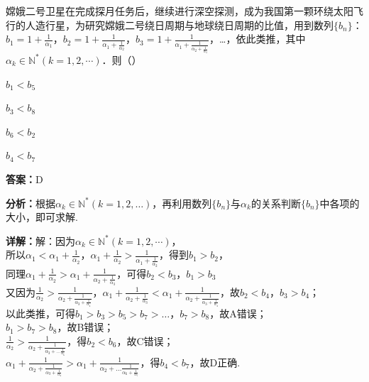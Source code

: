 \begin{question}[points=5]
嫦娥二号卫星在完成探月任务后，继续进行深空探测，成为我国第一颗环绕太阳飞行的人造行星，为研究嫦娥二号绕日周期与地球绕日周期的比值，用到数列$\{b_n\}$：$b_1 = 1 + \frac{1}{\alpha_1}$，$b_2 = 1 + \frac{1}{\alpha_1 + \frac{1}{\alpha_2}}$，$b_3 = 1 + \frac{1}{\alpha_1 + \frac{1}{\alpha_2 + \frac{1}{\alpha_3}}}$，…，依此类推，其中$\alpha_k \in \mathbb{N}^* (k = 1, 2, \cdots)$．则（\qquad）
\begin{choices}
  \item $b_1 < b_5$
  \item $b_3 < b_8$
  \item $b_6 < b_2$
  \item $b_4 < b_7$
\end{choices}
\begin{solution}
\textbf{答案：}D

\textbf{分析：}根据$\alpha_k \in \mathbb{N}^* (k = 1, 2, \dots)$，再利用数列$\{b_n\}$与$\alpha_k$的关系判断$\{b_n\}$中各项的大小，即可求解.

\textbf{详解：}解：因为$\alpha_k \in \mathbb{N}^* (k = 1, 2, \cdots)$，\\所以$\alpha_1 < \alpha_1 + \frac{1}{\alpha_2}$，$\alpha_1 + \frac{1}{\alpha_2} > \frac{1}{\alpha_1 + \frac{1}{\alpha_2}}$，得到$b_1 > b_2$，\\同理$\alpha_1 + \frac{1}{\alpha_2} > \alpha_1 + \frac{1}{\alpha_2 + \frac{1}{\alpha_3}}$，可得$b_2 < b_3$，$b_1 > b_3$\\又因为$\frac{1}{\alpha_2} > \frac{1}{\alpha_2 + \frac{1}{\alpha_3 + \frac{1}{\alpha_4}}}$，$\alpha_1 + \frac{1}{\alpha_2 + \frac{1}{\alpha_3}} < \alpha_1 + \frac{1}{\alpha_2 + \frac{1}{\alpha_3 + \frac{1}{\alpha_4}}}$，故$b_2 < b_4$，$b_3 > b_4$；\\以此类推，可得$b_1 > b_3 > b_5 > b_7 > \dots$，$b_7 > b_8$，故A错误；\\$b_1 > b_7 > b_8$，故B错误；\\$\frac{1}{\alpha_2} > \frac{1}{\alpha_2 + \frac{1}{\alpha_3 + \dots \frac{1}{\alpha_6}}}$，得$b_2 < b_6$，故C错误；\\$\alpha_1 + \frac{1}{\alpha_2 + \frac{1}{\alpha_3 + \frac{1}{\alpha_4}}} > \alpha_1 + \frac{1}{\alpha_2 + \dots \frac{1}{\alpha_6 + \frac{1}{\alpha_7}}}$，得$b_4 < b_7$，故D正确.
\end{solution}
\end{question}

